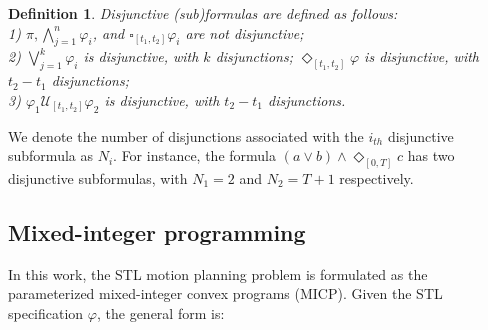 \documentclass[a4paper]{report}
\newtheorem{myDef}{Definition}
\begin{document}

\begin{myDef}
    Disjunctive (sub)formulas are defined as follows:\\
    1) $\pi, \bigwedge_{j=1}^{n} \varphi_{i}$, and $\square_{\left[t_{1}, t_{2}\right]} \varphi_{i}$ are not disjunctive;\\
    2) $\bigvee_{j=1}^{k} \varphi_{i}$ is disjunctive, with $k$ disjunctions;
    $\Diamond_{\left[t_{1}, t_{2}\right]} \varphi$ is disjunctive, with $t_{2}-t_{1}$ disjunctions;\\
    3) $\varphi_{1} \mathcal{U}_{\left[t_{1}, t_{2}\right]} \varphi_{2}$ is disjunctive, with $t_{2}-t_{1}$ disjunctions.
\end{myDef}


We denote the number of disjunctions associated with the $i_{th}$ disjunctive subformula as $N_i$. For instance, the formula $ (a\vee b)\wedge \Diamond_{[0,T]}c$ has two disjunctive subformulas, with $N_1=2$ and $N_2=T+1$ respectively.

\subsection{Mixed-integer programming}

In this work, the  STL motion planning problem is formulated as the parameterized mixed-integer convex programs (MICP). Given the STL specification $\varphi$, the general form is:
\end{document}
